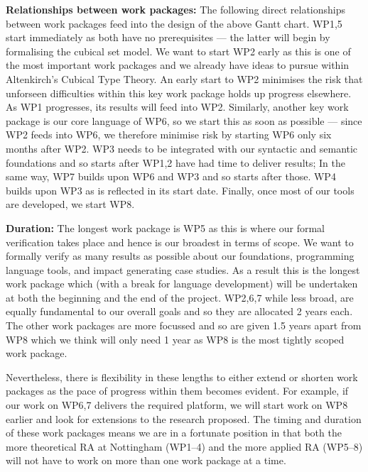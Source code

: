 \documentclass[a4paper,11pt]{article}
\begin{document}
\bigskip

{\bf Relationships between work packages:} The following direct
relationships between work packages feed into the design of the above
Gantt chart. WP1,5 start immediately as both have no prerequisites ---
the latter will begin by formalising the cubical set model. We want to
start WP2 early as this is one of the most important work packages and
we already have ideas to pursue within Altenkirch's Cubical Type
Theory. An early start to WP2 minimises the risk that unforseen
difficulties within this key work package holds
up progress elsewhere. As WP1 progresses, its results
will feed into WP2. Similarly, another key work package is our core
language of WP6, so we start this as soon as possible --- since WP2 feeds
into WP6, we therefore minimise risk by starting WP6 only six months after WP2. WP3 needs to be integrated with our syntactic
and semantic foundations and so starts after WP1,2 have had time to
deliver results; 
In the same way, WP7 builds upon WP6 and WP3 and so starts
after those. %
WP4 builds upon WP3 as is reflected in
its start date. Finally, once most of our tools are developed, we
start WP8.  

{\bf Duration:} The longest work package is WP5 as this is where our
formal verification takes place and hence is our broadest in terms of
scope. We want to formally verify as many results as possible about
our foundations, programming language tools, and impact generating
case studies.  As a result this is the longest work package which
(with a break for language development) will be undertaken at both the
beginning and the end of the project. WP2,6,7 while less broad, are
equally fundamental to our overall goals and so they are allocated 2
years each. The other work packages are more focussed and
so are given 1.5 years apart from WP8 which we think will only need 1
year as WP8 is the most tightly scoped work package.

Nevertheless, there is flexibility in these lengths to either extend
or shorten work packages as the pace of progress within them becomes
evident. For example, if our work on WP6,7 delivers the required
platform, we will start work on WP8 earlier and look for extensions
to the research proposed. The timing and duration of these work
packages means we are in a fortunate position in that both the more
theoretical RA at Nottingham (WP1--4) and the more applied RA (WP5--8)
will not have to work on more than one work package at a time.
\end{document}
